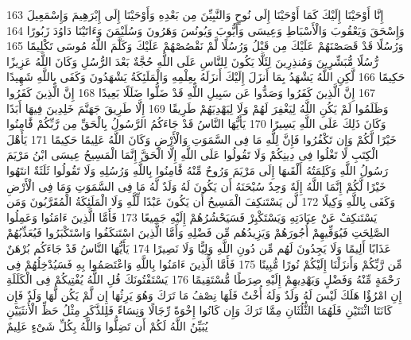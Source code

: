 {\tiny\colorbox{cl_aya}{163}} إِنَّا أَوْحَيْنَا إِلَيْكَ كَمَا أَوْحَيْنَا إِلَى نُوحٍ وَالنَّبِيِّنَ مِن بَعْدِهِ وَأَوْحَيْنَا إِلَى إِبْرَهِيمَ وَإِسْمَعِيلَ وَإِسْحَقَ وَيَعْقُوبَ وَالْأَسْبَاطِ وَعِيسَى وَأَيُّوبَ وَيُونُسَ وَهَرُونَ وَسُلَيْمَنَ وَءَاتَيْنَا دَاوُدَ زَبُورًا
{\tiny\colorbox{cl_aya}{164}} وَرُسُلًا قَدْ قَصَصْنَهُمْ عَلَيْكَ مِن قَبْلُ وَرُسُلًا لَّمْ نَقْصُصْهُمْ عَلَيْكَ وَكَلَّمَ اللَّهُ مُوسَى تَكْلِيمًا
{\tiny\colorbox{cl_aya}{165}} رُّسُلًا مُّبَشِّرِينَ وَمُنذِرِينَ لِئَلَّا يَكُونَ لِلنَّاسِ عَلَى اللَّهِ حُجَّةٌ بَعْدَ الرُّسُلِ وَكَانَ اللَّهُ عَزِيزًا حَكِيمًا
{\tiny\colorbox{cl_aya}{166}} لَّكِنِ اللَّهُ يَشْهَدُ بِمَا أَنزَلَ إِلَيْكَ أَنزَلَهُ بِعِلْمِهِ وَالْمَلَئِكَةُ يَشْهَدُونَ وَكَفَى بِاللَّهِ شَهِيدًا
{\tiny\colorbox{cl_aya}{167}} إِنَّ الَّذِينَ كَفَرُوا وَصَدُّوا عَن سَبِيلِ اللَّهِ قَدْ ضَلُّوا ضَلَلًا بَعِيدًا
{\tiny\colorbox{cl_aya}{168}} إِنَّ الَّذِينَ كَفَرُوا وَظَلَمُوا لَمْ يَكُنِ اللَّهُ لِيَغْفِرَ لَهُمْ وَلَا لِيَهْدِيَهُمْ طَرِيقًا
{\tiny\colorbox{cl_aya}{169}} إِلَّا طَرِيقَ جَهَنَّمَ خَلِدِينَ فِيهَا أَبَدًا وَكَانَ ذَلِكَ عَلَى اللَّهِ يَسِيرًا
{\tiny\colorbox{cl_aya}{170}} يَأَيُّهَا النَّاسُ قَدْ جَاءَكُمُ الرَّسُولُ بِالْحَقِّ مِن رَّبِّكُمْ فََٔامِنُوا خَيْرًا لَّكُمْ وَإِن تَكْفُرُوا فَإِنَّ لِلَّهِ مَا فِى السَّمَوَتِ وَالْأَرْضِ وَكَانَ اللَّهُ عَلِيمًا حَكِيمًا
{\tiny\colorbox{cl_aya}{171}} يَأَهْلَ الْكِتَبِ لَا تَغْلُوا فِى دِينِكُمْ وَلَا تَقُولُوا عَلَى اللَّهِ إِلَّا الْحَقَّ إِنَّمَا الْمَسِيحُ عِيسَى ابْنُ مَرْيَمَ رَسُولُ اللَّهِ وَكَلِمَتُهُ أَلْقَىهَا إِلَى مَرْيَمَ وَرُوحٌ مِّنْهُ فََٔامِنُوا بِاللَّهِ وَرُسُلِهِ وَلَا تَقُولُوا ثَلَثَةٌ انتَهُوا خَيْرًا لَّكُمْ إِنَّمَا اللَّهُ إِلَهٌ وَحِدٌ سُبْحَنَهُ أَن يَكُونَ لَهُ وَلَدٌ لَّهُ مَا فِى السَّمَوَتِ وَمَا فِى الْأَرْضِ وَكَفَى بِاللَّهِ وَكِيلًا
{\tiny\colorbox{cl_aya}{172}} لَّن يَسْتَنكِفَ الْمَسِيحُ أَن يَكُونَ عَبْدًا لِّلَّهِ وَلَا الْمَلَئِكَةُ الْمُقَرَّبُونَ وَمَن يَسْتَنكِفْ عَنْ عِبَادَتِهِ وَيَسْتَكْبِرْ فَسَيَحْشُرُهُمْ إِلَيْهِ جَمِيعًا
{\tiny\colorbox{cl_aya}{173}} فَأَمَّا الَّذِينَ ءَامَنُوا وَعَمِلُوا الصَّلِحَتِ فَيُوَفِّيهِمْ أُجُورَهُمْ وَيَزِيدُهُم مِّن فَضْلِهِ وَأَمَّا الَّذِينَ اسْتَنكَفُوا وَاسْتَكْبَرُوا فَيُعَذِّبُهُمْ عَذَابًا أَلِيمًا وَلَا يَجِدُونَ لَهُم مِّن دُونِ اللَّهِ وَلِيًّا وَلَا نَصِيرًا
{\tiny\colorbox{cl_aya}{174}} يَأَيُّهَا النَّاسُ قَدْ جَاءَكُم بُرْهَنٌ مِّن رَّبِّكُمْ وَأَنزَلْنَا إِلَيْكُمْ نُورًا مُّبِينًا
{\tiny\colorbox{cl_aya}{175}} فَأَمَّا الَّذِينَ ءَامَنُوا بِاللَّهِ وَاعْتَصَمُوا بِهِ فَسَيُدْخِلُهُمْ فِى رَحْمَةٍ مِّنْهُ وَفَضْلٍ وَيَهْدِيهِمْ إِلَيْهِ صِرَطًا مُّسْتَقِيمًا
{\tiny\colorbox{cl_aya}{176}} يَسْتَفْتُونَكَ قُلِ اللَّهُ يُفْتِيكُمْ فِى الْكَلَلَةِ إِنِ امْرُؤٌا هَلَكَ لَيْسَ لَهُ وَلَدٌ وَلَهُ أُخْتٌ فَلَهَا نِصْفُ مَا تَرَكَ وَهُوَ يَرِثُهَا إِن لَّمْ يَكُن لَّهَا وَلَدٌ فَإِن كَانَتَا اثْنَتَيْنِ فَلَهُمَا الثُّلُثَانِ مِمَّا تَرَكَ وَإِن كَانُوا إِخْوَةً رِّجَالًا وَنِسَاءً فَلِلذَّكَرِ مِثْلُ حَظِّ الْأُنثَيَيْنِ يُبَيِّنُ اللَّهُ لَكُمْ أَن تَضِلُّوا وَاللَّهُ بِكُلِّ شَىْءٍ عَلِيمٌ
